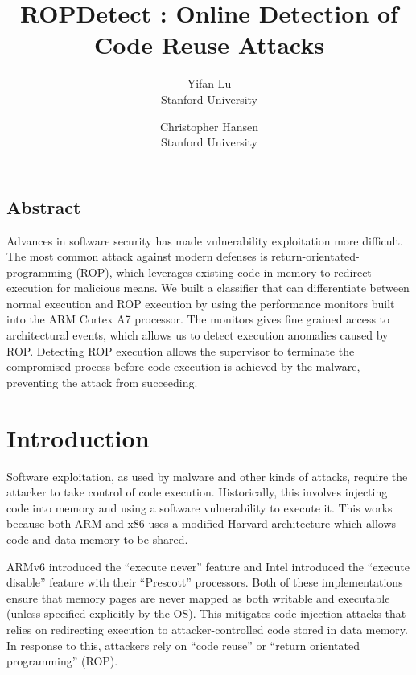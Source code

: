 \documentclass[letterpaper,twocolumn,10pt]{article}
\begin{document}
\date{}

\title{\Large \bf ROPDetect : Online Detection of Code Reuse Attacks}

\author{
{\rm Yifan Lu}\\
Stanford University
\and
{\rm Christopher Hansen}\\
Stanford University
}

\maketitle

\thispagestyle{empty}


\subsection*{Abstract}

Advances in software security has made vulnerability exploitation more difficult. The most common 
attack against modern defenses is return-orientated-programming (ROP), which leverages existing code in 
memory to redirect execution for malicious means. We built a classifier that can differentiate 
between normal execution and ROP execution by using the performance monitors built into the ARM Cortex A7
processor. The monitors gives fine grained access to architectural events, which allows us to 
detect execution anomalies caused by ROP. Detecting ROP execution allows the supervisor to terminate 
the compromised process before code execution is achieved by the malware, preventing the attack 
from succeeding.

\section{Introduction}

Software exploitation, as used by malware and other kinds of attacks, require the attacker to 
take control of code execution. Historically, this involves injecting code into memory and 
using a software vulnerability to execute it. This works because both ARM and x86 uses a 
modified Harvard architecture which allows code and data memory to be shared.

ARMv6 introduced the ``execute never''\cite{ARMv6} feature and Intel introduced the ``execute disable'' 
feature with their ``Prescott'' processors\cite{HP}. Both of these implementations ensure that 
memory pages are never mapped as both writable and executable (unless specified explicitly by the OS). 
This mitigates code 
injection attacks that relies on redirecting execution to attacker-controlled code stored 
in data memory. In response to this, attackers rely on ``code reuse'' or 
``return orientated programming'' (ROP). 
\end{document}
